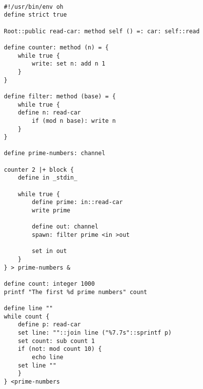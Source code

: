 \documentclass[12pt]{book}
\begin{document}
\begin{lstlisting}

#!/usr/bin/env oh
define strict true

Root::public read-car: method self () =: car: self::read

define counter: method (n) = {
    while true {
        write: set n: add n 1
    }
}

define filter: method (base) = {
    while true {
	define n: read-car
        if (mod n base): write n
    }
}

define prime-numbers: channel

counter 2 |+ block {
    define in _stdin_

    while true {
        define prime: in::read-car
        write prime

        define out: channel
        spawn: filter prime <in >out

        set in out
    }
} > prime-numbers &

define count: integer 1000
printf "The first %d prime numbers" count

define line ""
while count {
    define p: read-car
    set line: ""::join line ("%7.7s"::sprintf p)
    set count: sub count 1
    if (not: mod count 10) {
        echo line
	set line ""
    }
} <prime-numbers
\end{lstlisting}




\end{document}

